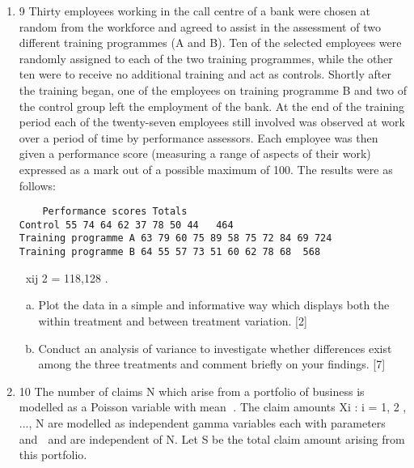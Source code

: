 \documentclass[a4paper,12pt]{article}
\begin{document}
\begin{enumerate}
\item 9 Thirty employees working in the call centre of a bank were chosen at random from
the workforce and agreed to assist in the assessment of two different training
programmes (A and B).
Ten of the selected employees were randomly assigned to each of the two training
programmes, while the other ten were to receive no additional training and act as
controls.
Shortly after the training began, one of the employees on training programme B and
two of the control group left the employment of the bank.
At the end of the training period each of the twenty-seven employees still involved
was observed at work over a period of time by performance assessors. Each
employee was then given a performance score (measuring a range of aspects of their
work) expressed as a mark out of a possible maximum of 100.
The results were as follows:
\begin{verbatim}
    Performance scores Totals
Control 55 74 64 62 37 78 50 44   464
Training programme A 63 79 60 75 89 58 75 72 84 69 724
Training programme B 64 55 57 73 51 60 62 78 68  568

\end{verbatim}
xij
2 = 118,128 .
\begin{enumerate}[(a)]
\item Plot the data in a simple and informative way which displays both the within
treatment and between treatment variation. [2]
\item  Conduct an analysis of variance to investigate whether differences exist
among the three treatments and comment briefly on your findings. [7]
\end{enumerate}
\item 10 The number of claims N which arise from a portfolio of business is modelled as a
Poisson variable with mean . The claim amounts Xi : i = 1, 2 , ..., N are modelled as
independent gamma variables each with parameters  and  and are independent of
N. Let S be the total claim amount arising from this portfolio.
\begin{enumerate}[(a)]


\end{enumerate}
\end{enumerate}
\end{document}
